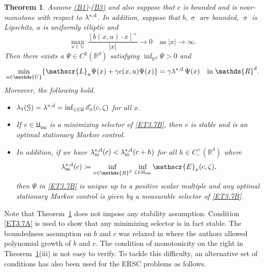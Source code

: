 \documentclass[notitlepage,11pt,reqno]{amsart}
\numberwithin{equation}{section}
\theoremstyle{plain}
\newtheorem{theorem}{Theorem}[section]
\theoremstyle{definition}
\theoremstyle{remark}
\newcommand{\Act}{{\mathds{U}}}
\newcommand{\sE}{{\mathscr{E}}}     %
\newcommand{\cG}{{\mathcal{G}}}     %
\newcommand{\sL}{{\mathscr{L}}}
\newcommand{\Uadm}{\mathfrak{U}}
\newcommand{\Usm}{\mathfrak{U}_{\mathrm{sm}}}
\newcommand{\lamstrdf}{\lambda^{*,{\rm d}}}
\newcommand{\Rd}{{\mathds{R}^{d}}}
\newcommand{\df}{\coloneqq}
\begin{document}
\begin{theorem}\label{T3.7}
Assume \hyperlink{B1}{(B1)}-\hyperlink{B3}{(B3)} and also suppose that
$c$ is bounded and is near-monotone with respect to $\lamstrdf$. In addition, suppose that $b, \upsigma$ are bounded, $\upsigma$ is Lipschitz, $a$ is uniformly elliptic and
\begin{equation}\label{ET3.7A}
\max_{u\in\Act}\, \frac{[b(x, u)\cdot x]^+}{|x|}\to 0
\quad \text{as}\; |x|\to\infty.
\end{equation}
Then there exists a
$\Psi\in C^2(\Rd)$ satisfying $\inf_{\Rd}\Psi>0$ and
\begin{equation}\label{ET3.7B}
\min_{u\in\Act}\{\sL_u\Psi(x) + \gamma c(x, u)\Psi(x)\}=\gamma\lamstrdf\,\Psi(x)\quad \text{in}\; \Rd.
\end{equation}
Moreover, the following hold.
\begin{itemize}
\item[(i)] $\lambda_1(\cG)=\lamstrdf=\inf_{\zeta\in\Uadm} \sE_x(c, \zeta)$ for all $x$.
\item[(ii)] If $v\in\Usm$ is a minimizing selector of \eqref{ET3.7B},
then $v$ is stable and is an optimal stationary Markov control.
\item[(iii)] In addition, if we have 
$\lambda^{*,{\rm d}}_{\rm m}(c)<\lambda^{*,{\rm d}}_{\rm m}(c+h)$ for all $h\in C^+_\circ(\Rd)$ where
$$\lambda^{*,{\rm d}}_{\rm m}(c)\df \inf_{x\in\Rd}\,\inf_{\zeta\in\Usm} \sE_x(c, \zeta),$$
then $\Psi$ in \eqref{ET3.7B} is unique up to a positive scalar multiple and
any optimal stationary Markov control is given by a measurable selector
of \eqref{ET3.7B}.
\end{itemize}
\end{theorem}
Note that Theorem~\ref{T3.7} does not impose any stability assumption. Condition \eqref{ET3.7A} is used to show that any minimizing selector is in fact stable. The boundedness assumption on
$b$ and $c$ was relaxed in \cite[Proposition~5.2]{MR4188837} where the authors allowed polynomial growth of $b$ and $c$. The condition of
monotonicity on the right in Theorem~\ref{T3.7}(iii) is not easy to
verify. To tackle this difficulty, an alternative set of conditions has also been used
for the ERSC problems as follows.
\end{document}
